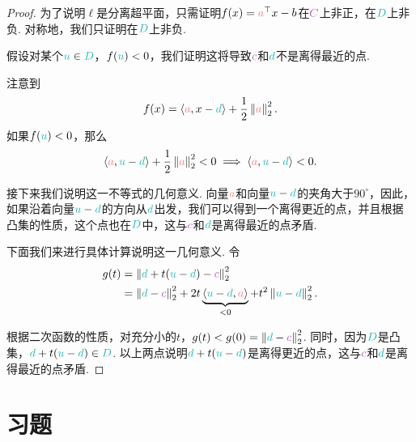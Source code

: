 \begin{proof}
    为了说明$\ell$是分离超平面，只需证明$f(x) = \textcolor{Salmon}{a}^\top x - b$在$\light{C}$上非正，在$\contrastlight{D}$上非负. 对称地，我们只证明在$\contrastlight{D}$上非负.
    
    假设对某个$\contrastlight{u} \in \contrastlight{D}$，$f(\contrastlight{u}) < 0$，我们证明这将导致$\light{c}$和$\contrastlight{d}$不是离得最近的点.
    
    注意到
    \[
    f(x) = \inner{\textcolor{Salmon}{a}}{x - \contrastlight{d}} + \frac{1}{2} \norm{\textcolor{Salmon}{a}}_2^2.
    \]
    如果$f(\contrastlight{u}) < 0$，那么
    \[
    \inner{\textcolor{Salmon}{a}}{\contrastlight{u} - \contrastlight{d}} + \frac{1}{2} \norm{\textcolor{Salmon}{a}}_2^2 < 0 \implies \inner{\textcolor{Salmon}{a}}{\contrastlight{u} - \contrastlight{d}} < 0.
    \]
    
    接下来我们说明这一不等式的几何意义. 向量$\textcolor{Salmon}{a}$和向量$\contrastlight{u} - \contrastlight{d}$的夹角大于$90^\circ$，因此，如果沿着向量$\contrastlight{u} - \contrastlight{d}$的方向从$\contrastlight{d}$出发，我们可以得到一个离得更近的点，并且根据凸集的性质，这个点也在$\contrastlight{D}$中，这与$\light{c}$和$\contrastlight{d}$是离得最近的点矛盾.
    
    下面我们来进行具体计算说明这一几何意义. 令
    \begin{align*}
        g(t) &= \norm{\contrastlight{d} + t (\contrastlight{u} - \contrastlight{d}) - \light{c}}_2^2\\
        &= \norm{\contrastlight{d} - \light{c}}_2^2 + 2t \underbrace{\inner{\contrastlight{u} - \contrastlight{d}}{\textcolor{Salmon}{a}}}_{< 0} + t^2 \norm{\contrastlight{u} - \contrastlight{d}}_2^2.
    \end{align*}
    
    根据二次函数的性质，对充分小的$t$，$g(t) < g(0) = \norm{\contrastlight{d} - \light{c}}_2^2$. 同时，因为$\contrastlight{D}$是凸集，$\contrastlight{d} + t(\contrastlight{u} - \contrastlight{d}) \in \contrastlight{D}$. 以上两点说明$\contrastlight{d} + t(\contrastlight{u} - \contrastlight{d})$是离得更近的点，这与$\light{c}$和$\contrastlight{d}$是离得最近的点矛盾.
\end{proof}
\section{习题}

